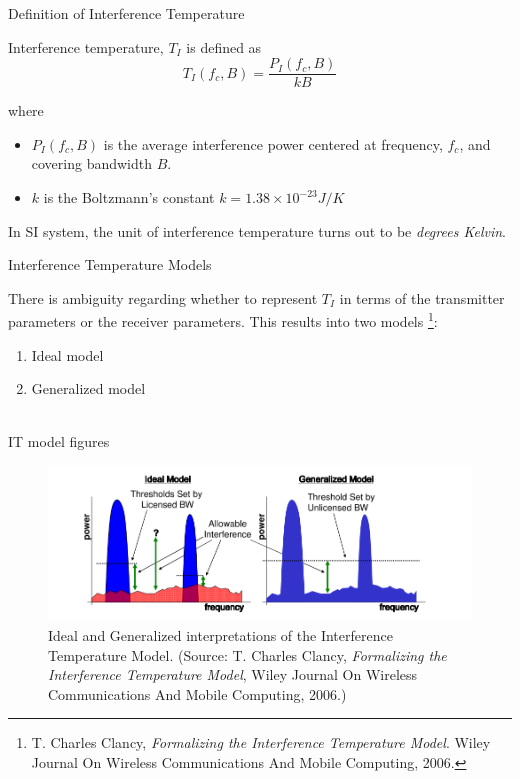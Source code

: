 \documentclass[mathserif]{beamer}
\begin{document}
\begin{frame}{Definition of Interference Temperature}

Interference temperature, $T_I$ is defined as
\begin{equation*} 
    T_I(f_c , B) = \frac{P_I(f_c , B)}{kB}
\end{equation*}

where 

\begin{itemize}
	\item $P_I(f_c,B)$ is the average interference power centered at frequency, $f_c$, and covering bandwidth
$B$. 
	\item $k$ is the Boltzmann's constant $k = 1.38 \times 10^{-23} J/K $ 
\end{itemize}

\pause
In SI system, the unit of interference temperature turns out to be \emph{degrees Kelvin}.

\end{frame}



\begin{frame}{Interference Temperature Models}

There is ambiguity regarding whether to represent $T_I$ in terms of the transmitter parameters or the receiver parameters. This results into two models \footnote{T. Charles Clancy, \emph{Formalizing the Interference Temperature Model}. Wiley Journal On Wireless Communications And Mobile Computing, 2006.}:

\pause
\begin{enumerate}
    \item Ideal model
    \item Generalized model \\~\\
\end{enumerate}
\end{frame}



\begin{frame}{IT model figures}

\begin{figure}[p]
\centering
\includegraphics[width = \linewidth]{interferenceTemperatureModels.png}
\caption{Ideal and Generalized interpretations of the Interference Temperature Model. (Source: T. Charles Clancy, \emph{Formalizing the Interference Temperature Model}, Wiley Journal On Wireless Communications And Mobile Computing, 2006.)}
\end{figure}

\end{frame}
\end{document}
